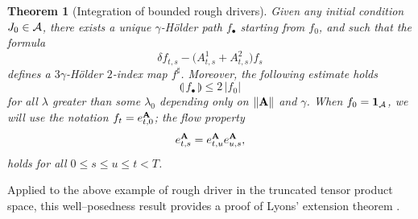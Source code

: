 \documentclass[11pt,a4paper]{amsart}
\renewcommand{\leq}{\leqslant}
\newtheorem{thm}{\hspace{-0.15cm}  {\sc Theorem} } %
\numberwithin{equation}{section} %
\begin{document}
\begin{thm}[Integration of bounded rough drivers]
\label{ThmIntegrationLinearBounded}
Given any initial condition $J_0\in\mathcal{A}$, there  exists a unique $\gamma$-H\"older path $f_\bullet$ starting from $f_0$, and such that the formula 
  \begin{equation*}
    \delta f_{t, s} - \Big(A^1_{t, s} +A^2_{t, s}\Big) f_s 
  \end{equation*}
defines a $3\gamma$-H\"older $2$-index map $f^\sharp$. Moreover, the following estimate holds
  \begin{equation}
  \label{EqLinearBound}
    \llparenthesis\, f_\bullet \,\rrparenthesis \leqslant 2\,\big| f_0 \big|
  \end{equation}
for all $\lambda$ greater than some $\lambda_0$ depending only on $\| \bf A \|$ and $\gamma$. When $f_0  ={\bf 1}_{\mathcal{A}}$, we will use the notation $ f_t =e^{\bf A}_{t,0}$; the flow property
$$
e^{\bf A}_{t, s} = e^{\bf A}_{t, u} e^{\bf A}_{u, s},
$$
holds for all $0\leq s\leq u\leq t<T$.
\end{thm}

\medskip

Applied to the above example of rough driver in the truncated tensor product space, this well--posedness result provides a proof of Lyons' extension theorem \cite{Lyons98}.

\medskip
\end{document}
